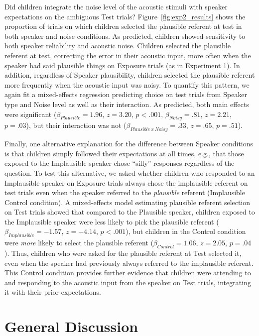 \documentclass[man,floatsintext]{apa6}
\begin{document}
Did children integrate the noise level of the acoustic stimuli with speaker expectations on the ambiguous Test trials? Figure~\ref{fig:exp2_results} shows the proportion of trials on which children selected the plausible referent at test in both speaker and noise conditions. As predicted, children showed sensitivity to both speaker reliability and acoustic noise. Children selected the plausible referent at test, correcting the error in their acoustic input, more often when the speaker had said plausible things on Exposure trials (as in Experiment 1). In addition, regardless of Speaker plausibility, children selected the plausible referent more frequently when the acoustic input was noisy. To quantify this pattern, we again fit a mixed-effects regression predicting choice on test trials from Speaker type and Noise level as well as their interaction. As predicted, both main effects were significant ($\beta_{Plausible} = 1.96$,  $z = 3.20$, $p <.001$, $\beta_{Noisy} = .81$,  $z = 2.21$, $p = .03$), but their interaction was not ($\beta_{Plausible \: x \: Noisy} = .33$,  $z = .65$, $p = .51$).

Finally, one alternative explanation for the difference between Speaker conditions is that children simply followed their expectations at all times, e.g., that those exposed to the Implausible speaker chose ``silly'' responses regardless of the question. To test this alternative, we asked whether children who responded to an Implausible speaker on Exposure trials always chose the implausible referent on test trials even when the speaker referred to the \emph{plausible} referent (Implausible Control condition). A mixed-effects model estimating plausible referent selection on Test trials showed that compared to the Plausible speaker, children exposed to the Implausible speaker were less likely to pick the plausible referent ($\beta_{Implausible} = -1.57$,  $z = -4.14$, $p <.001$), but children in the Control condition were \emph{more} likely to select the plausible referent ($\beta_{Control} = 1.06$,  $z = 2.05$, $p = .04$). Thus, children who were asked for the plausible referent at Test selected it, even when the speaker had previously always referred to the implausible referent. This Control condition provides further evidence that children were attending to and responding to the acoustic input from the speaker on Test trials, integrating it with their prior expectations.


\section{General Discussion}
\end{document}
